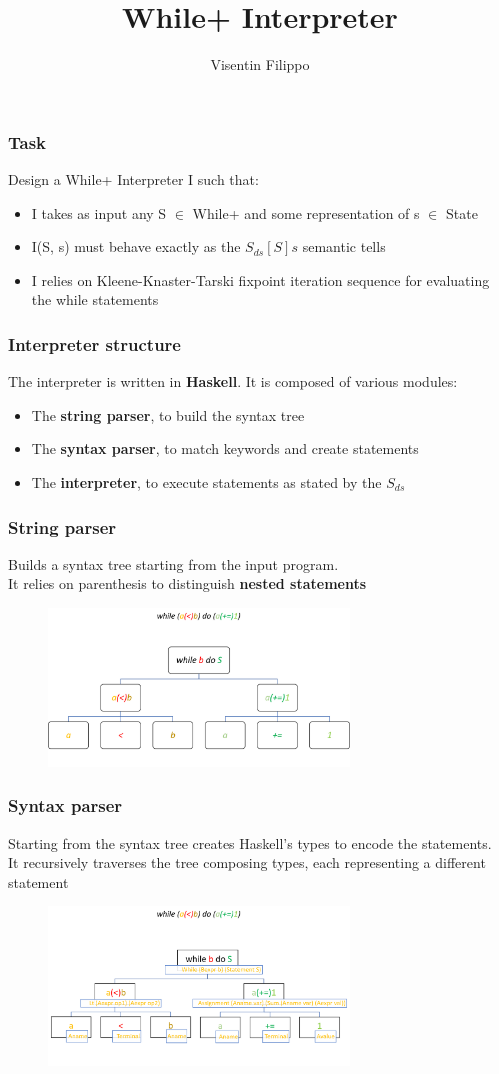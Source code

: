 \documentclass{beamer}
\title{While+ Interpreter}
\author{Visentin Filippo}
\begin{document}
\frame{\titlepage}

\begin{frame}
\frametitle{Task}
Design a While+ Interpreter I such that:
\begin{itemize}
	\item I takes as input any S $\in$ While+ and some representation of s $\in$ State
	\item I(S, s) must behave exactly as the $S_{ds}[S]s$ semantic tells
	\item I relies on Kleene-Knaster-Tarski fixpoint iteration sequence for evaluating the while statements
\end{itemize}
\end{frame}

\begin{frame}
	\frametitle{Interpreter structure}
	The interpreter is written in \textbf{Haskell}.
	It is composed of various modules:
	\begin{itemize}
		\item The \textbf{string parser}, to build the syntax tree
		\item The \textbf{syntax parser}, to match keywords and create statements
		\item The \textbf{interpreter}, to execute statements as stated by the $S_{ds}$
	\end{itemize}

\end{frame}
\begin{frame}
	\frametitle{String parser}
	Builds a syntax tree starting from the input program. \\
	It relies on parenthesis to distinguish \textbf{nested statements}
	\begin{figure}[h]
		\includegraphics[width=8cm]{syntree}
	\end{figure}
\end{frame}

\begin{frame}
	\frametitle{Syntax parser}
	Starting from the syntax tree creates Haskell's types to encode the statements.\\
	It recursively traverses the tree composing types, each representing a different statement
	\begin{figure}[h]
		\includegraphics[width=8cm]{syntypes}
	\end{figure}
\end{frame}
\end{document}
